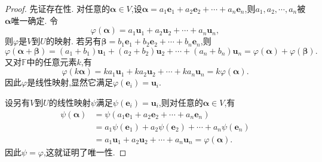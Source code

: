 \documentclass[../../main.tex]{subfiles}%
\begin{document}
\begin{proof}

先证存在性. 对任意的\(\boldsymbol{\alpha}\in V\),设\(\boldsymbol{\alpha}=a_1\boldsymbol{e}_1 + a_2\boldsymbol{e}_2+\cdots + a_n\boldsymbol{e}_n\),则\(a_1,a_2,\cdots,a_n\)被\(\boldsymbol{\alpha}\)唯一确定. 令
\[
\varphi(\boldsymbol{\alpha})=a_1\boldsymbol{u}_1 + a_2\boldsymbol{u}_2+\cdots + a_n\boldsymbol{u}_n,
\]
则\(\varphi\)是\(V\)到\(U\)的映射. 若另有\(\boldsymbol{\beta}=b_1\boldsymbol{e}_1 + b_2\boldsymbol{e}_2+\cdots + b_n\boldsymbol{e}_n\),则
\[
\varphi(\boldsymbol{\alpha}+\boldsymbol{\beta})=(a_1 + b_1)\boldsymbol{u}_1+(a_2 + b_2)\boldsymbol{u}_2+\cdots+(a_n + b_n)\boldsymbol{u}_n=\varphi(\boldsymbol{\alpha})+\varphi(\boldsymbol{\beta}).
\]
又对\(\mathbb{F}\)中的任意元素\(k\),有
\[
\varphi(k\boldsymbol{\alpha})=ka_1\boldsymbol{u}_1 + ka_2\boldsymbol{u}_2+\cdots + ka_n\boldsymbol{u}_n=k\varphi(\boldsymbol{\alpha}).
\]
因此\(\varphi\)是线性映射,显然它满足\(\varphi(\boldsymbol{e}_i)=\boldsymbol{u}_i\).

设另有\(V\)到\(U\)的线性映射\(\psi\)满足\(\psi(\boldsymbol{e}_i)=\boldsymbol{u}_i\),则对任意的\(\boldsymbol{\alpha}\in V\),有
\begin{align*}
\psi(\boldsymbol{\alpha})&=\psi(a_1\boldsymbol{e}_1 + a_2\boldsymbol{e}_2+\cdots + a_n\boldsymbol{e}_n)\\
&=a_1\psi(\boldsymbol{e}_1)+a_2\psi(\boldsymbol{e}_2)+\cdots + a_n\psi(\boldsymbol{e}_n)\\
&=a_1\boldsymbol{u}_1 + a_2\boldsymbol{u}_2+\cdots + a_n\boldsymbol{u}_n=\varphi(\boldsymbol{\alpha}).
\end{align*}
因此\(\psi = \varphi\),这就证明了唯一性. 

\end{proof}
\end{document}
